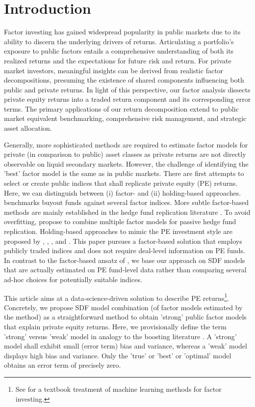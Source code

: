 \documentclass[12pt]{article}
\begin{document}
\section{Introduction}
\label{sec:factor_investing}

Factor investing has gained widespread popularity in public markets due to its ability to discern the underlying drivers of returns. 
Articulating a portfolio's exposure to public factors entails a comprehensive understanding of both its realized returns and the expectations for future risk and return. 
For private market investors, meaningful insights can be derived from realistic factor decompositions, presuming the existence of shared components influencing both public and private returns. 
In light of this perspective, our factor analysis dissects private equity returns into a traded return component and its corresponding error terms. 
The primary applications of our return decomposition extend to public market equivalent benchmarking, comprehensive risk management, and strategic asset allocation.

Generally, more sophisticated methods are required to estimate factor models for private (in comparison to public) asset classes as private returns are not directly observable on liquid secondary markets.
However, the challenge of identifying the 'best' factor model is the same as in public markets.
There are first attempts to select or create public indices that shall replicate private equity (PE) returns.
Here, we can distinguish between (i) factor- and (ii) holding-based approaches.
\cite{P14} benchmarks buyout funds against several factor indices.
More subtle factor-based methods are mainly established in the hedge fund replication literature \citep{TV08,W14}.
To avoid overfitting, \cite{OST17} propose to combine multiple factor models for passive hedge fund replication.
Holding-based approaches to mimic the PE investment style are proposed by \cite{LSSL16}, \cite{S17}, \cite{MS19}, and \cite{PP19}.
This paper pursues a factor-based solution that employs publicly traded indices and does not require deal-level information on PE funds.
In contrast to the factor-based ansatz of \cite{P14}, we base our approach on SDF models that are actually estimated on PE fund-level data rather than comparing several ad-hoc choices for potentially suitable indices.

This article aims at a data-science-driven solution to describe PE returns\footnote{See \cite{CG23} for a textbook treatment of machine learning methods for factor investing.}.
Concretely, we propose SDF model combination (of factor models estimated by the \cite{DLP12} method) as a straightforward method to obtain 'strong' public factor models that explain private equity returns.
Here, we provisionally define the term 'strong' versus 'weak' model in analogy to the boosting literature \citep{S90}.
A 'strong' model shall exhibit small (error term) bias and variance, whereas a 'weak' model displays high bias and variance.
Only the 'true' or 'best' or 'optimal' model obtains an error term of precisely zero.
\end{document}
